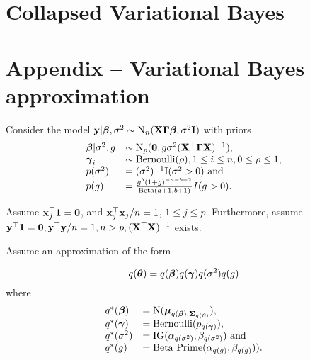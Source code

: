 \documentclass{amsart}[12pt]
\begin{document}
\section{Collapsed Variational Bayes}

\section{Appendix -- Variational Bayes approximation}

Consider the model ${\bf y} | {\boldsymbol \beta}, \sigma^2 \sim \text{N}_n({\bf X} {\boldsymbol \Gamma} {\boldsymbol \beta}, \sigma^2 {\bf I})$ with
priors
\begin{equation*}
	\begin{array}{ll}
		{\boldsymbol\beta} | \sigma^2, g & \sim \text{N}_p({\bf 0}, g \sigma^2({\bf X}^\top {\boldsymbol\Gamma} {\bf X})^{-1}),        \\
		{\boldsymbol \gamma}_i            & \sim \text{Bernoulli}(\rho), 1 \leq i \leq n, 0 \leq \rho \leq 1,      \\
		p(\sigma^2)          & = (\sigma^2)^{-1} \text{I}(\sigma^2 > 0) \text{ and }                        \\
		p(g)                 & = \frac{g^b (1 + g)^{-a - b - 2}}{\text{Beta}(a + 1, b + 1)} I(g > 0). 
	\end{array}
\end{equation*}

Assume ${\bf x}_j^\top{\bf1} = {\bf 0}$, and ${\bf x}_j^\top {\bf x}_j / n = 1$, $1 \leq j \leq p$.
Furthermore, assume ${\bf y}^\top {\bf1} = {\bf 0}, {\bf y}^\top {\bf y} / n  = 1, n > p, ({\bf X}^\top {\bf X})^{-1}$ exists.

Assume an approximation of the form

\begin{equation*}
	q({\boldsymbol \theta}) = q({\boldsymbol \beta}) q({\boldsymbol \gamma}) q(\sigma^2) q(g)
\end{equation*}
where
\begin{equation*}
	\begin{array}{ll}
		q^*({\boldsymbol \beta})   & = \text{N}({\boldsymbol \mu}_{q({\boldsymbol \beta}), {\boldsymbol \Sigma}_{q({\boldsymbol \beta})}}),                  \\
		q^*({\boldsymbol \gamma})  & = \text{Bernoulli}(p_{q({\boldsymbol \gamma})}),                                 \\
		q^*(\sigma^2) & = \text{IG}(\alpha_{q(\sigma^2)}, \beta_{q(\sigma^2)}) \text{ and } \\
		q^*(g)        & = \text{Beta Prime}(\alpha_{q(g)}, \beta_{q(g)})).                  \\
	\end{array}
\end{equation*}
\end{document}
